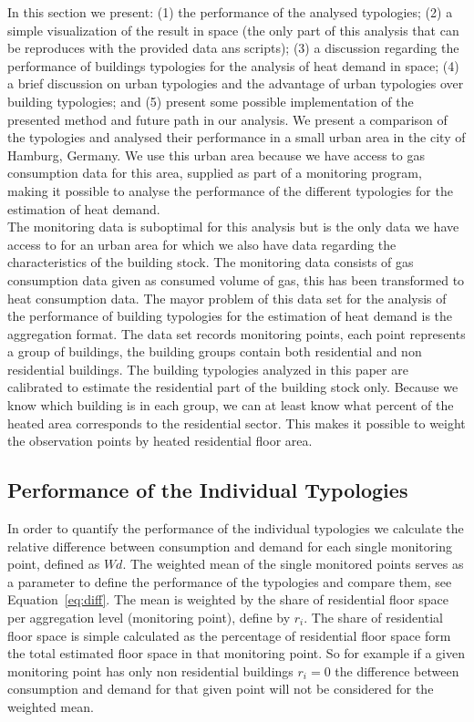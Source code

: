 \documentclass[authoryear,preprint,review,12pt]{elsarticle}
\begin{document}
\begin{linenumbers}
In this section we present: (1) the performance of the analysed typologies; (2)
a simple visualization of the result in space (the only part of this analysis
that can be reproduces with the provided data ans scripts); (3) a discussion
regarding the performance of buildings typologies for the analysis of heat
demand in space; (4) a brief discussion on urban typologies and the advantage
of urban typologies over building typologies; and (5) present some possible
implementation of the presented method and future path in our analysis.  We
present a comparison of the typologies and analysed their performance in a
small urban area in the city of Hamburg, Germany. We use this urban area
because we have access to gas consumption data for this area, supplied as part
of a monitoring program, making it possible to analyse the performance of the
different typologies for the estimation of heat demand.\\

The monitoring data is suboptimal for this analysis but is the only data we
have access to for an urban area for which we also have data regarding the
characteristics of the building stock. The monitoring data consists of gas
consumption data given as consumed volume of gas, this has been transformed to
heat consumption data. The mayor problem of this data set for the analysis of
the performance of building typologies for the estimation of heat demand is the
aggregation format. The data set records monitoring points, each point
represents a group of buildings, the building groups contain both residential
and non residential buildings. The building typologies analyzed in this paper
are calibrated to estimate the residential part of the building stock only.
Because we know which building is in each group, we can at least know what
percent of the heated area corresponds to the residential sector. This makes it
possible to weight the observation points by heated residential floor area.\\

\subsection{Performance of the Individual Typologies}

In order to quantify the performance of the individual typologies we calculate
the relative difference between consumption and demand for each single
monitoring point, defined as $Wd$.  The weighted mean of the single monitored
points serves as a parameter to define the performance of the typologies and
compare them, see Equation~\ref{eq:diff}.  The mean is weighted by the share of
residential floor space per aggregation level (monitoring point), define by
$r_i$. The share of residential floor space is simple calculated as the
percentage of residential floor space form the total estimated floor space in
that monitoring point.  So for example if a given monitoring point has only non
residential buildings $r_i = 0$ the difference between consumption and demand
for that given point will not be considered for the weighted mean.\\


\end{linenumbers}
\end{document}
